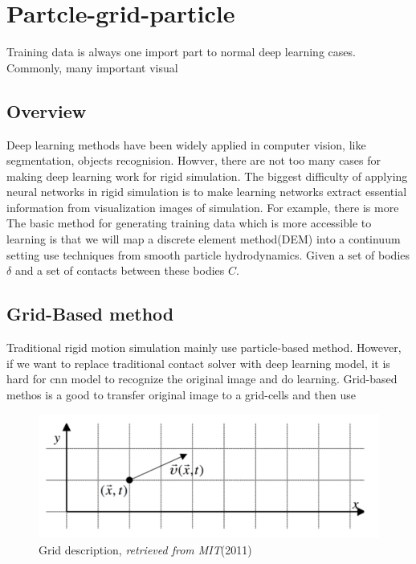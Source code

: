
\chapter{Partcle-grid-particle}
    Training data is always one import part to normal deep learning cases. Commonly, many important visual 

\section{Overview}
    Deep learning methods have been widely applied in computer vision, like segmentation, objects recognision. Howver, there are not too many cases for making deep learning work for rigid simulation. The biggest difficulty of applying neural networks in rigid simulation is to make learning networks extract essential information from visualization images of simulation. For example, there is more \\

    The basic method for generating training data which is more accessible to learning is that we will map a discrete element method(DEM) into a continuum setting use techniques from smooth particle hydrodynamics. Given a set of bodies $\delta$ and a set of contacts between these bodies $C$.  

\section{Grid-Based method}
    Traditional rigid motion simulation mainly use particle-based method. However, if we want to replace traditional contact solver with deep learning model, it is hard for cnn model to recognize the original image and do learning. Grid-based methos is a good to transfer original image to a grid-cells and then use

    \begin{figure}
        \centering
        \includegraphics[scale = 0.4]{Figures/grid_method.png}
        \caption{Grid description, \textit{retrieved from MIT}(2011)}
    \end{figure}

